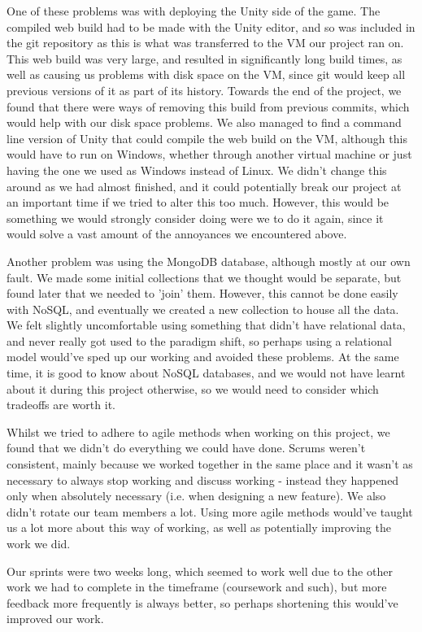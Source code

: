 One of these problems was with deploying the Unity side of the game. The compiled web build had to be made with the Unity editor, and so was included in the git repository as this is what was transferred to the VM our project ran on.  This web build was very large, and resulted in significantly long build times, as well as causing us problems with disk space on the VM, since git would keep all previous versions of it as part of its history. Towards the end of the project, we found that there were ways of removing this build from previous commits, which would help with our disk space problems. We also managed to find a command line version of Unity that could compile the web build on the VM, although this would have to run on Windows, whether through another virtual machine or just having the one we used as Windows instead of Linux. We didn't change this around as we had almost finished, and it could potentially break our project at an important time if we tried to alter this too much. However, this would be something we would strongly consider doing were we to do it again, since it would solve a vast amount of the annoyances we encountered above.

Another problem was using the MongoDB database, although mostly at our own fault. We made some initial collections that we thought would be separate, but found later that we needed to 'join' them. However, this cannot be done easily with NoSQL, and eventually we created a new collection to house all the data. We felt slightly uncomfortable using something that didn't have relational data, and never really got used to the paradigm shift, so perhaps using a relational model would've sped up our working and avoided these problems. At the same time, it is good to know about NoSQL databases, and we would not have learnt about it during this project otherwise, so we would need to consider which tradeoffs are worth it.

Whilst we tried to adhere to agile methods when working on this project, we found that we didn't do everything we could have done. Scrums weren't consistent, mainly because we worked together in the same place and it wasn't as necessary to always stop working and discuss working - instead they happened only when absolutely necessary (i.e. when designing a new feature). We also didn't rotate our team members a lot. Using more agile methods would've taught us a lot more about this way of working, as well as potentially improving the work we did.

Our sprints were two weeks long, which seemed to work well due to the other work we had to complete in the timeframe (coursework and such), but more feedback more frequently is always better, so perhaps shortening this would've improved our work.

